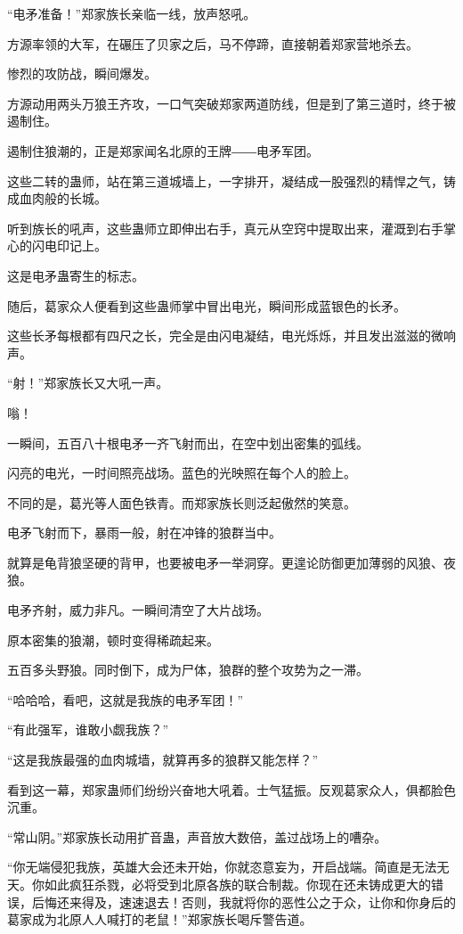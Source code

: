 
\begin{this_body}

“电矛准备！”郑家族长亲临一线，放声怒吼。

方源率领的大军，在碾压了贝家之后，马不停蹄，直接朝着郑家营地杀去。

惨烈的攻防战，瞬间爆发。

方源动用两头万狼王齐攻，一口气突破郑家两道防线，但是到了第三道时，终于被遏制住。

遏制住狼潮的，正是郑家闻名北原的王牌――电矛军团。

这些二转的蛊师，站在第三道城墙上，一字排开，凝结成一股强烈的精悍之气，铸成血肉般的长城。

听到族长的吼声，这些蛊师立即伸出右手，真元从空窍中提取出来，灌溉到右手掌心的闪电印记上。

这是电矛蛊寄生的标志。

随后，葛家众人便看到这些蛊师掌中冒出电光，瞬间形成蓝银色的长矛。

这些长矛每根都有四尺之长，完全是由闪电凝结，电光烁烁，并且发出滋滋的微响声。

“射！”郑家族长又大吼一声。

嗡！

一瞬间，五百八十根电矛一齐飞射而出，在空中划出密集的弧线。

闪亮的电光，一时间照亮战场。蓝色的光映照在每个人的脸上。

不同的是，葛光等人面色铁青。而郑家族长则泛起傲然的笑意。

电矛飞射而下，暴雨一般，射在冲锋的狼群当中。

就算是龟背狼坚硬的背甲，也要被电矛一举洞穿。更遑论防御更加薄弱的风狼、夜狼。

电矛齐射，威力非凡。一瞬间清空了大片战场。

原本密集的狼潮，顿时变得稀疏起来。

五百多头野狼。同时倒下，成为尸体，狼群的整个攻势为之一滞。

“哈哈哈，看吧，这就是我族的电矛军团！”

“有此强军，谁敢小觑我族？”

“这是我族最强的血肉城墙，就算再多的狼群又能怎样？”

看到这一幕，郑家蛊师们纷纷兴奋地大吼着。士气猛振。反观葛家众人，俱都脸色沉重。

“常山阴。”郑家族长动用扩音蛊，声音放大数倍，盖过战场上的嘈杂。

“你无端侵犯我族，英雄大会还未开始，你就恣意妄为，开启战端。简直是无法无天。你如此疯狂杀戮，必将受到北原各族的联合制裁。你现在还未铸成更大的错误，后悔还来得及，速速退去！否则，我就将你的恶性公之于众，让你和你身后的葛家成为北原人人喊打的老鼠！”郑家族长喝斥警告道。


\end{this_body}
